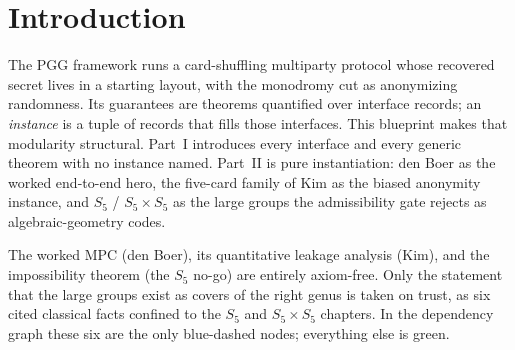 
\chapter{Introduction}

The PGG framework runs a card-shuffling multiparty protocol whose recovered
secret lives in a starting layout, with the monodromy cut as anonymizing
randomness. Its guarantees are theorems quantified over interface records; an
\emph{instance} is a tuple of records that fills those interfaces. This
blueprint makes that modularity structural. Part~I introduces every interface
and every generic theorem with no instance named. Part~II is pure
instantiation: den Boer as the worked end-to-end hero, the five-card family of
Kim as the biased anonymity instance, and $S_5$ / $S_5\times S_5$ as the large
groups the admissibility gate rejects as algebraic-geometry codes.

The worked MPC (den Boer), its quantitative leakage analysis (Kim), and the
impossibility theorem (the $S_5$ no-go) are entirely axiom-free. Only the
statement that the large groups exist as covers of the right genus is taken on
trust, as six cited classical facts confined to the $S_5$ and $S_5\times S_5$
chapters. In the dependency graph these six are the only blue-dashed nodes;
everything else is green.


